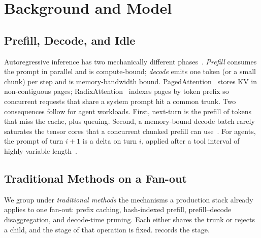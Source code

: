 \section{Background and Model}
\label{sec:problem}

\subsection{Prefill, Decode, and Idle}
Autoregressive inference has two mechanically different phases~\cite{orca,distserve,splitwise}.
\emph{Prefill} consumes the prompt in parallel and is compute-bound; \emph{decode} emits one token (or a small chunk) per step and is memory-bandwidth bound.
PagedAttention~\cite{vllm} stores KV in non-contiguous pages; RadixAttention~\cite{sglang} indexes pages by token prefix so concurrent requests that share a system prompt hit a common trunk.
Two consequences follow for agent workloads.
First, next-turn \ttft{} is the prefill of tokens that miss the cache, plus queuing.
Second, a memory-bound decode batch rarely saturates the tensor cores that a concurrent chunked prefill can use~\cite{sarathi}.
For agents, the prompt of turn $i{+}1$ is a delta on turn $i$, applied after a tool interval of highly variable length~\cite{continuum,mori}.

\subsection{Traditional Methods on a Fan-out}
\label{sec:traditional}
We group under \emph{traditional methods} the mechanisms a production stack already applies to one fan-out: prefix caching, hash-indexed prefill, prefill--decode disaggregation, and decode-time pruning.
Each either shares the trunk or rejects a child, and the stage of that operation is fixed.
 records the stage.


